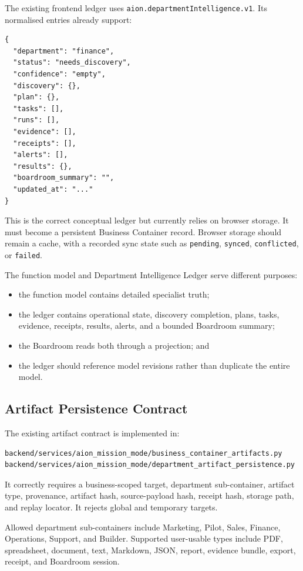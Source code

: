 The existing frontend ledger uses \texttt{aion.departmentIntelligence.v1}. Its
normalised entries already support:

\begin{verbatim}
{
  "department": "finance",
  "status": "needs_discovery",
  "confidence": "empty",
  "discovery": {},
  "plan": {},
  "tasks": [],
  "runs": [],
  "evidence": [],
  "receipts": [],
  "alerts": [],
  "results": {},
  "boardroom_summary": "",
  "updated_at": "..."
}
\end{verbatim}

This is the correct conceptual ledger but currently relies on browser storage.
It must become a persistent Business Container record. Browser storage should
remain a cache, with a recorded sync state such as \texttt{pending},
\texttt{synced}, \texttt{conflicted}, or \texttt{failed}.

The function model and Department Intelligence Ledger serve different purposes:

\begin{itemize}
  \item the function model contains detailed specialist truth;
  \item the ledger contains operational state, discovery completion, plans,
  tasks, evidence, receipts, results, alerts, and a bounded Boardroom summary;
  \item the Boardroom reads both through a projection; and
  \item the ledger should reference model revisions rather than duplicate the
  entire model.
\end{itemize}

\subsection{Artifact Persistence Contract}

The existing artifact contract is implemented in:

\begin{verbatim}
backend/services/aion_mission_mode/business_container_artifacts.py
backend/services/aion_mission_mode/department_artifact_persistence.py
\end{verbatim}

It correctly requires a business-scoped target, department sub-container,
artifact type, provenance, artifact hash, source-payload hash, receipt hash,
storage path, and replay locator. It rejects global and temporary targets.

Allowed department sub-containers include Marketing, Pilot, Sales, Finance,
Operations, Support, and Builder. Supported user-usable types include PDF,
spreadsheet, document, text, Markdown, JSON, report, evidence bundle, export,
receipt, and Boardroom session.


